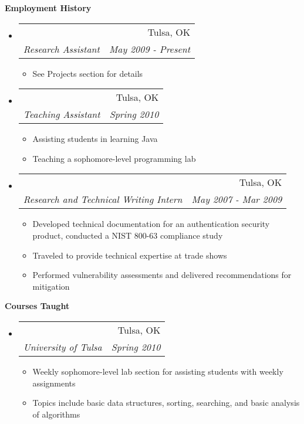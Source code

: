 \documentclass[letterpaper,11pt]{article}
\makeatletter
\newcommand{\resitem}[1]{\item #1 \vspace{-2pt}}
\newcommand{\resheading}[1]{{\large \colorbox{mygrey}{\begin{minipage}{\textwidth}{\textbf{#1 \vphantom{p\^{E}}}}\end{minipage}}}}
\newcommand{\ressubheading}[4]{
\begin{tabular*}{6.5in}{l@{\extracolsep{\fill}}r}
		\textbf{\parbox{5in}{\raggedright #1 }} & #2 \\
		\textit{#3} & \textit{#4} \\
\end{tabular*}\vspace{-6pt}}
\makeatother
\begin{document}
\resheading{Employment History}
\begin{itemize}
\item
	\ressubheading{Institute for Information Security, TU}{Tulsa, OK}{Research Assistant}{May 2009 - Present}
	\begin{itemize}
		\resitem{See Projects section for details}
	\end{itemize}

\item
	\ressubheading{University of Tulsa}{Tulsa, OK}{Teaching Assistant}{Spring 2010}
	\begin{itemize}
		\resitem{Assisting students in learning Java}
		\resitem{Teaching a sophomore-level programming lab}
	\end{itemize}
\item
	\ressubheading{Vidoop}{Tulsa, OK}{Research and Technical Writing Intern}{May 2007 - Mar 2009}
	\begin{itemize}
		\resitem{Developed technical documentation for an authentication security product, conducted a NIST 800-63 compliance study}
		\resitem{Traveled to provide technical expertise at trade shows}
		\resitem{Performed vulnerability assessments and delivered recommendations for mitigation}
	\end{itemize}
\end{itemize}

\resheading{Courses Taught}
\begin{itemize}
\item
	\ressubheading{Fundamentals of Algorithm and Computer Applications Lab}{Tulsa, OK}{University of Tulsa}{Spring 2010}
	\begin{itemize}
		\resitem{Weekly sophomore-level lab section for assisting students with weekly assignments}
		\resitem{Topics include basic data structures, sorting, searching, and basic analysis of algorithms}
	\end{itemize}
\end{itemize}
\end{document}
